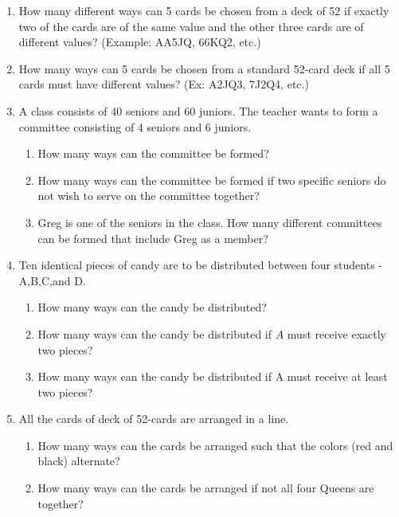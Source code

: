 \documentclass[
  12pt,
]{krantzNoCorner}
\providecommand{\tightlist}{%
  \setlength{\itemsep}{0pt}\setlength{\parskip}{0pt}}
\begin{document}
\begin{enumerate}
\def\labelenumi{\arabic{enumi}.}
\item
  How many different ways can 5 cards be chosen from a deck of 52 if
  exactly two of the cards are of the same value and the other three
  cards are of different values? (Example: AA5JQ, 66KQ2, etc.)
\item
  How many ways can 5 cards be chosen from a standard 52-card deck if
  all 5 cards must have different values? (Ex: A2JQ3, 7J2Q4, etc.)
\item
  A class consists of 40 seniors and 60 juniors. The teacher wants to
  form a committee consisting of 4 seniors and 6 juniors.

  \begin{enumerate}
  \def\labelenumii{\alph{enumii}.}
  \tightlist
  \item
    How many ways can the committee be formed?
  \item
    How many ways can the committee be formed if two specific
    seniors do not wish to serve on the committee together?
  \item
    Greg is one of the seniors in the class. How many different
    committees can be formed that include Greg as a member?
  \end{enumerate}
\item
  Ten identical pieces of candy are to be distributed between four
  students - A,B,C,and D.

  \begin{enumerate}
  \def\labelenumii{\alph{enumii}.}
  \tightlist
  \item
    How many ways can the candy be distributed?
  \item
    How many ways can the candy be distributed if \(A\) must receive
    exactly two pieces?
  \item
    How many ways can the candy be distributed if A must receive at
    least two pieces?
  \end{enumerate}
\item
  All the cards of deck of 52-cards are arranged in a line.

  \begin{enumerate}
  \def\labelenumii{\alph{enumii}.}
  \tightlist
  \item
    How many ways can the cards be arranged such that the colors
    (red and black) alternate?
  \item
    How many ways can the cards be arranged if not all four Queens
    are together?
  \end{enumerate}
\end{enumerate}
\end{document}
